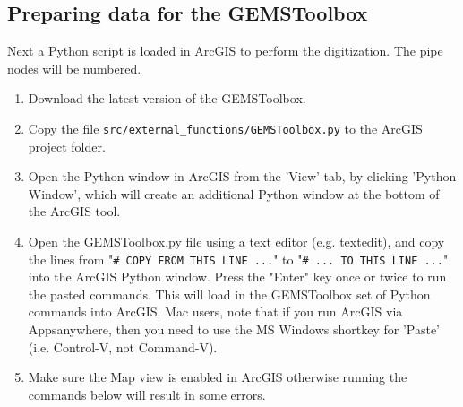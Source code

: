 \subsection{Preparing data for the GEMSToolbox}
Next a Python script is loaded in ArcGIS to perform the digitization. The pipe nodes will be numbered.

\begin{enumerate}
   \item Download the latest version of the GEMSToolbox.
   \item Copy the file {\tt src/external\_functions/GEMSToolbox.py} to the ArcGIS project folder.
   \item Open the Python window in ArcGIS from the 'View' tab, by clicking 'Python Window', which will create an additional Python window at the bottom of the ArcGIS tool. 
   \item Open the GEMSToolbox.py file using a text editor (e.g. textedit), and copy the lines from "{\tt \# COPY FROM THIS LINE ...}" to "{\tt \# ... TO THIS LINE ...}" into the ArcGIS Python window. Press the "Enter" key once or twice to run the pasted commands. This will load in the GEMSToolbox set of Python commands into ArcGIS. Mac users, note that if you run ArcGIS via Appsanywhere, then you need to use the MS Windows shortkey for 'Paste' (i.e. Control-V, not Command-V). 
   \item Make sure the Map view is enabled in ArcGIS otherwise running the commands below will result in some errors.

\end{enumerate}
